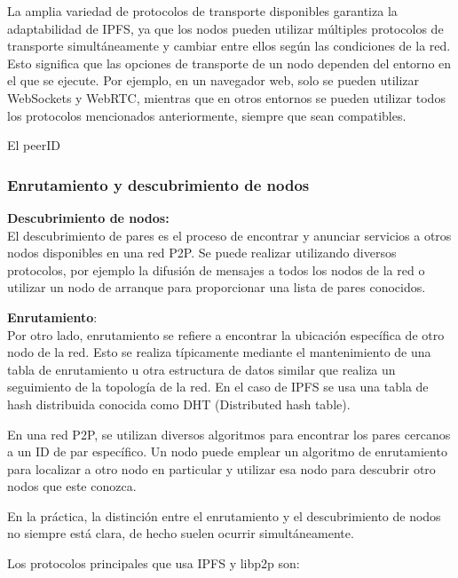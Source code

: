 La amplia variedad de protocolos de transporte disponibles garantiza la adaptabilidad de IPFS, ya que los nodos pueden utilizar múltiples protocolos de transporte simultáneamente y cambiar entre ellos según las condiciones de la red. Esto significa que las opciones de transporte de un nodo dependen del entorno en el que se ejecute. Por ejemplo, en un navegador web, solo se pueden utilizar WebSockets y WebRTC, mientras que en otros entornos se pueden utilizar todos los protocolos mencionados anteriormente, siempre que sean compatibles.

El peerID

\subsubsection{Enrutamiento y descubrimiento de nodos}
\textbf{Descubrimiento de nodos:}
\\El descubrimiento de pares es el proceso de encontrar y anunciar servicios a otros nodos disponibles en una red P2P. Se puede realizar utilizando diversos protocolos, por ejemplo la difusión de mensajes a todos los nodos de la red o
utilizar un nodo de arranque para proporcionar una lista de pares conocidos.

\textbf{Enrutamiento}:
\\Por otro lado, enrutamiento se refiere a encontrar la ubicación específica de otro nodo de la red. Esto se realiza
típicamente mediante el mantenimiento de una tabla de enrutamiento u otra estructura de datos similar que realiza un
seguimiento de la topología de la red. En el caso de IPFS se usa una tabla de hash distribuida conocida como DHT (Distributed
hash table).

En una red P2P, se utilizan diversos algoritmos para encontrar los pares cercanos a un ID de par específico. Un nodo puede
emplear un algoritmo de enrutamiento para localizar a otro nodo en particular y utilizar esa nodo para descubrir otro nodos
que este conozca.

En la práctica, la distinción entre el enrutamiento y el descubrimiento de nodos no siempre está clara, de hecho suelen ocurrir simultáneamente.

Los protocolos principales que usa IPFS y libp2p son:

